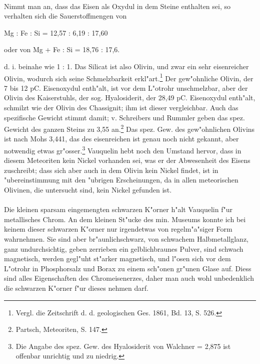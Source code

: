 \documentclass[a4paper, 11pt, oneside, german]{article}
\begin{document}
\paragraph{}
Nimmt man an, dass das Eisen als Oxydul in dem Steine enthalten sei, so verhalten sich die Sauerstoffmengen von
\begin{center}
Mg : Fe : Si = 12,57 : 6,19 : 17,60 
\end{center}
\begin{center}
oder von Mg + Fe : Si = 18,76 : 17,6.
\end{center}
d. i. beinahe wie 1 : 1. Das Silicat ist also Olivin, und zwar ein sehr eisenreicher Olivin, wodurch sich seine Schmelzbarkeit erkl"art.\footnote{Vergl. die Zeitschrift d. d. geologischen Ges. 1861, Bd. 13, S. 526.} Der gew"ohnliche Olivin, der 7 bis 12 pC. Eisenoxydul enth"alt, ist vor dem L"otrohr unschmelzbar, aber der Olivin des Kaiserstuhls, der sog. Hyalosiderit, der 28,49 pC. Eisenoxydul enth"alt, schmilzt wie der Olivin des Chassignit; ihm ist dieser vergleichbar. Auch das spezifische Gewicht stimmt damit; v. Schreibers und Rummler geben das spez. Gewicht des ganzen Steins zu 3,55 an.\footnote{Partsch, Meteoriten, S. 147.} Das spez. Gew. des gew"ohnlichen Olivins ist nach Mohs 3,441, das des eisenreichen ist genau noch nicht gekannt, aber notwendig etwas gr"osser.\footnote{Die Angabe des spez. Gew. des Hyalosiderit von Walchner = 2,875 ist offenbar unrichtig und zu niedrig.} Vauquelin hebt noch den Umstand hervor, dass in diesem Meteoriten kein Nickel vorhanden sei, was er der Abwesenheit des Eisens zuschreibt; dass sich aber auch in dem Olivin kein Nickel findet, ist in "ubereinstimmung mit den "ubrigen Erscheinungen, da in allen meteorischen Olivinen, die untersucht sind, kein Nickel gefunden ist.
\paragraph{}
Die kleinen sparsam eingemengten schwarzen K"orner h"alt Vauquelin f"ur metallisches Chrom. An dem kleinen St"ucke des min. Museums konnte ich bei keinem dieser schwarzen K"orner nur irgendetwas von regelm"a"siger Form wahrnehmen. Sie sind aber br"aunlichschwarz, von schwachem Halbmetallglanz, ganz undurchsichtig, geben zerrieben ein gelblichbraunes Pulver, sind schwach magnetisch, werden gegl"uht st"arker magnetisch, und l"osen sich vor dem L"otrohr in Phosphorsalz und Borax zu einem sch"onen gr"unen Glase auf. Diess sind alles Eigenschaften des Chromeisenerzes, daher man auch wohl unbedenklich die schwarzen K"orner f"ur dieses nehmen darf.
\end{document}

